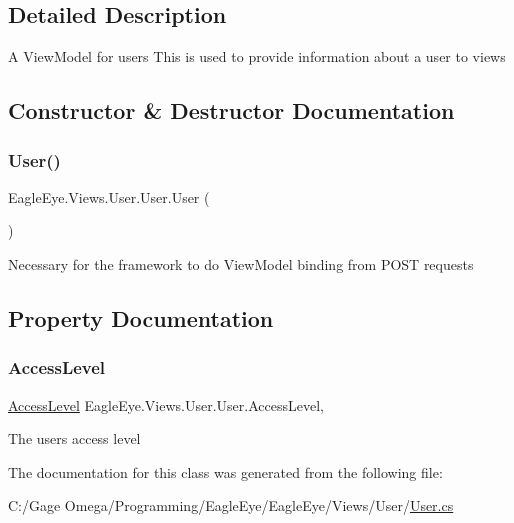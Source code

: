 \subsection{Detailed Description}
A View\+Model for users This is used to provide information about a user to views 



\subsection{Constructor \& Destructor Documentation}
\mbox{\label{class_eagle_eye_1_1_views_1_1_user_1_1_user_afaf7ca813d3573cb9a84ac392cfc5901}} 
\subsubsection{\texorpdfstring{User()}{User()}}
{\footnotesize\ttfamily Eagle\+Eye.\+Views.\+User.\+User.\+User (\begin{DoxyParamCaption}{ }\end{DoxyParamCaption})}



Necessary for the framework to do View\+Model binding from P\+O\+ST requests 



\subsection{Property Documentation}
\mbox{\label{class_eagle_eye_1_1_views_1_1_user_1_1_user_ad00af0bd442d99c28dd3068240226053}} 
\subsubsection{\texorpdfstring{AccessLevel}{AccessLevel}}
{\footnotesize\ttfamily \mbox{\hyperlink{namespace_eagle_eye_1_1_views_1_1_user_a5ec08150416703595770d50460878d89}{Access\+Level}} Eagle\+Eye.\+Views.\+User.\+User.\+Access\+Level\hspace{0.3cm}{\ttfamily [get]}, {\ttfamily [set]}}



The user\textquotesingle{}s access level 



The documentation for this class was generated from the following file\+:\begin{DoxyCompactItemize}
\item 
C\+:/\+Gage Omega/\+Programming/\+Eagle\+Eye/\+Eagle\+Eye/\+Views/\+User/\mbox{\hyperlink{_user_8cs}{User.\+cs}}\end{DoxyCompactItemize}
